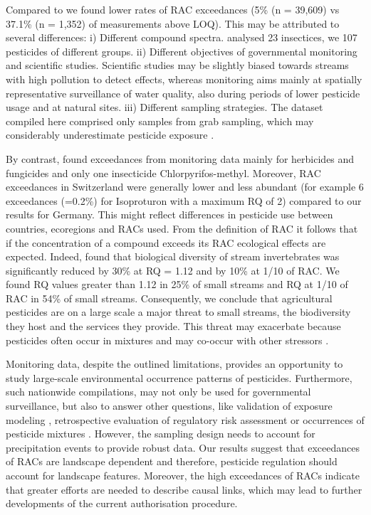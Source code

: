 \documentclass[journal=esthag,manuscript=article]{achemso}
\begin{document}
Compared to \citet{stehle_pesticide_2015} we found lower rates of RAC exceedances (5\% (n = 39,609) vs 37.1\% (n = 1,352) of measurements above LOQ). 
This may be attributed to several differences: i) Different compound spectra. \citet{stehle_pesticide_2015} analysed 23 insectices, we 107 pesticides of different groups. ii) Different objectives of governmental monitoring and scientific studies. Scientific studies may be slightly biased towards streams with high pollution to detect effects, whereas monitoring aims mainly at spatially representative surveillance of water quality, also during periods of lower pesticide usage and at natural sites. iii) Different sampling strategies. The dataset compiled here comprised only samples from grab sampling, which may considerably underestimate pesticide exposure \citep{stehle_probabilistic_2013}. 

By contrast, \citet{knauer_pesticides_2016} found exceedances from monitoring data mainly for herbicides and fungicides and only one insecticide Chlorpyrifos-methyl.
Moreover, RAC exceedances in Switzerland were generally lower and less abundant (for example 6 exceedances (=0.2\%) for Isoproturon with a maximum RQ of 2) compared to our results for Germany. 
This might reflect differences in pesticide use between countries, ecoregions and RACs used. 
From the definition of RAC it follows that if the concentration of a compound exceeds its RAC ecological effects are expected.
Indeed, \citet{stehle_agricultural_2015} found that biological diversity of stream invertebrates was significantly reduced by 30\% at RQ = 1.12 and by 10\% at 1/10 of RAC.
We found RQ values greater than 1.12 in 25\% of small streams and RQ at 1/10 of RAC in 54\% of small streams. 
Consequently, we conclude that agricultural pesticides are on a large scale a major threat to small streams, the biodiversity they host and the services they provide. 
This threat may exacerbate because pesticides often occur in mixtures \cite{schreiner_pesticide_2016} and may co-occur with other stressors \citep{schafer_contribution_2016}. 

Monitoring data, despite the outlined limitations, provides an opportunity to study large-scale environmental occurrence patterns of pesticides.
Furthermore, such nationwide compilations, may not only be used for governmental surveillance, but also to answer other questions, like validation of exposure modeling \cite{knabel_fungicide_2014}, retrospective evaluation of regulatory risk assessment \citep{knauer_pesticides_2016,stehle_pesticide_2015}or occurrences of pesticide mixtures \cite{schreiner_pesticide_2016}.
However, the sampling design needs to account for precipitation events to provide robust data. 
Our results suggest that exceedances of RACs are landscape dependent %
and therefore, pesticide regulation should account for landscape features. 
Moreover, the high exceedances of RACs indicate that greater efforts are needed to describe causal links, which may lead to further developments of the current authorisation procedure.
\end{document}
